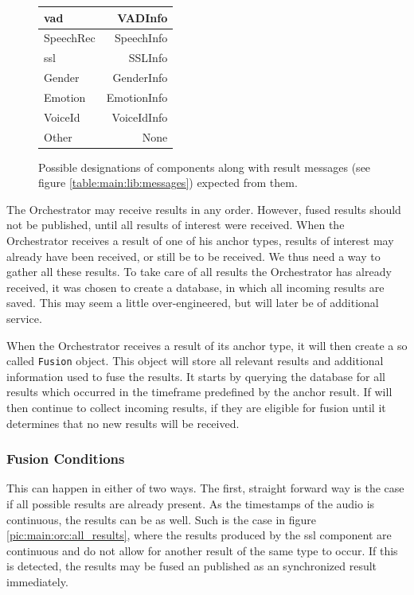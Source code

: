 \begin{figure}[]
	\centering
	\begin{tabular}{| l | r |}
		\hline
		\gls{vad} 		& VADInfo	 	\\ \hline
		SpeechRec		& SpeechInfo		\\ \hline
		\gls{ssl}		& SSLInfo		\\ \hline
		Gender			& GenderInfo		\\ \hline
		Emotion			& EmotionInfo		\\ \hline
		VoiceId			& VoiceIdInfo		\\ \hline
		Other 			& None	 	\\ \hline
	\end{tabular}
	\caption{Possible designations of components along with result messages (see figure \ref{table:main:lib:messages}) expected from them.}
	\label{table:main:designations}
\end{figure}

The Orchestrator may receive results in any order.
However, fused results should not be published, until all results of interest were received.
When the Orchestrator receives a result of one of his anchor types, results of interest may already have been received, or still be to be received.
We thus need a way to gather all these results.
To take care of all results the Orchestrator has already received, it was chosen to create a database, in which all incoming results are saved.
This may seem a little over-engineered, but will later be of additional service.

When the Orchestrator receives a result of its anchor type, it will then create a so called \texttt{Fusion} object.
This object will store all relevant results and additional information used to fuse the results.
It starts by querying the database for all results which occurred in the timeframe predefined by the anchor result.
If will then continue to collect incoming results, if they are eligible for fusion until it determines that no new results will be received.

\subsubsection{Fusion Conditions}
This can happen in either of two ways.
The first, straight forward way is the case if all possible results are already present.
As the timestamps of the audio is continuous, the results can be as well.
Such is the case in figure \ref{pic:main:orc:all_results}, where the results produced by the \gls{ssl} component are continuous and do not allow for another result of the same type to occur.
If this is detected, the results may be fused an published as an synchronized result immediately.

